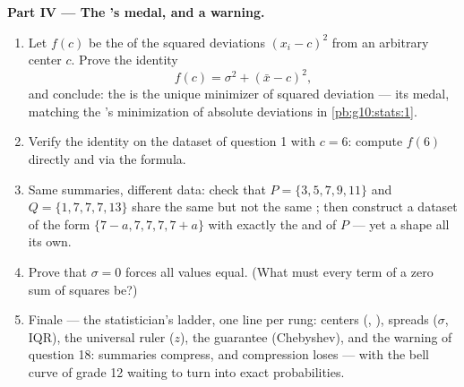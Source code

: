 \begin{problem}
\medskip
\noindent\textbf{Part IV --- The 's medal, and a warning.}
\begin{enumerate}[resume]
  \item Let $f(c)$ be the  of the squared deviations
        $(x_i - c)^2$ from an arbitrary center $c$. Prove the
        identity
        \[
        f(c) = \sigma^2 + (\bar x - c)^2 ,
        \]
        and conclude: the  is the unique minimizer of 
        squared deviation --- its medal, matching the 's
        minimization of absolute deviations in
        \cref{pb:g10:stats:1}.
  \item Verify the identity on the dataset of question 1 with
        $c = 6$: compute $f(6)$ directly and via the formula.
  \item Same summaries, different data: check that
        $P = \{3, 5, 7, 9, 11\}$ and $Q = \{1, 7, 7, 7, 13\}$
        share the same  but not the same ; then
        construct a dataset of the form
        $\{7 - a, 7, 7, 7, 7 + a\}$ with exactly the  and
         of $P$ --- yet a shape all its own.
  \item Prove that $\sigma = 0$ forces all values equal. (What
        must every term of a zero sum of squares be?)
  \item Finale --- the statistician's ladder, one line per
        rung: centers (, ), spreads ($\sigma$, IQR),
        the universal ruler ($z$), the guarantee (Chebyshev),
        and the warning of question 18: summaries compress,
        and compression loses --- with the bell curve of grade
        12 waiting to turn  into exact probabilities.
\end{enumerate}
\end{problem}
